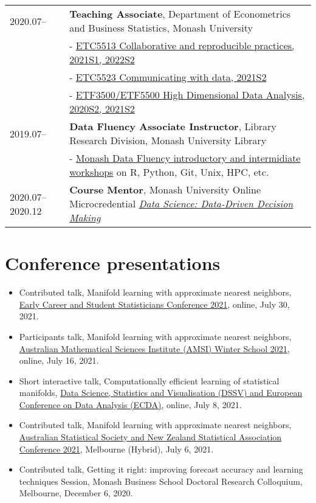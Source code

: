 \documentclass[10pt,a4paper,]{article}
\begin{document}
\begin{tabular}{ll}
  2020.07-- & \textbf{Teaching Associate}, Department of Econometrics and Business Statistics, Monash University \\ 
   & - \href{https://handbook.monash.edu/2021/units/ETC5513?year=2021}{ETC5513 Collaborative and reproducible practices, 2021S1, 2022S2} \\ 
   & - \href{https://handbook.monash.edu/2021/units/ETC5523?year=2021}{ETC5523 Communicating with data, 2021S2} \\ 
   & - \href{https://handbook.monash.edu/2020/units/ETF5500?year=2020}{ETF3500/ETF5500 High Dimensional Data Analysis, 2020S2, 2021S2} \\ 
  2019.07-- & \textbf{Data Fluency Associate Instructor}, Library Research Division, Monash University Library \\ 
   & - \href{https://www.monash.edu/data-fluency/home}{Monash Data Fluency introductory and intermidiate workshops} on R, Python, Git, Unix, HPC, etc. \\ 
  2020.07--2020.12 & \textbf{Course Mentor}, Monash University Online Microcredential \href{https://www.futurelearn.com/microcredentials/data-driven-decision-making?utm_source=faculty_website&utm_medium=monash_organic_referrer&utm_campaign=mc_jan}{\textit{Data Science: Data-Driven Decision Making}} \\ 
  \end{tabular}

\hypertarget{conference-presentations}{%
\section{Conference presentations}\label{conference-presentations}}

\begin{itemize}
\item
  Contributed talk, Manifold learning with approximate nearest
  neighbors,
  \href{http://ecssc2021.com.au/}{Early Career and Student Statisticians Conference 2021},
  online, July 30, 2021.
\item
  Participants talk, Manifold learning with approximate nearest
  neighbors,
  \href{https://ws.amsi.org.au/}{Australian Mathematical Sciences Institute (AMSI) Winter School 2021},
  online, July 16, 2021.
\item
  Short interactive talk, Computationally efficient learning of
  statistical manifolds,
  \href{https://iasc-isi.org/dssv-ecda2021/}{Data Science, Statistics and Visualisation (DSSV) and European Conference on Data Analysis (ECDA)},
  online, July 8, 2021.
\item
  Contributed talk, Manifold learning with approximate nearest
  neighbors,
  \href{https://anzsc2021.com.au/}{Australian Statistical Society and New Zealand Statistical Association Conference 2021},
  Melbourne (Hybrid), July 6, 2021.
\item
  Contributed talk, Getting it right: improving forecast accuracy and
  learning techniques Session, Monash Business School Doctoral Research
  Colloquium, Melbourne, December 6, 2020.
\end{itemize}
\end{document}
